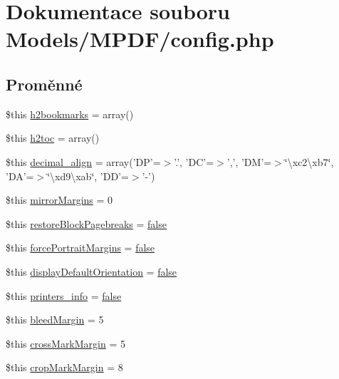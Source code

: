 \hypertarget{config_8php}{\section{Dokumentace souboru Models/\-M\-P\-D\-F/config.php}
\label{config_8php}
}
\subsection*{Proměnné}
\begin{DoxyCompactItemize}
\item 
\$this \hyperlink{config_8php_a0d318a973a665abc308c719941b316a4}{h2bookmarks} = array()
\item 
\$this \hyperlink{config_8php_a7fdd837f73ced736bdaa63537f326fec}{h2toc} = array()
\item 
\$this \hyperlink{config_8php_a93e75bd3c5d3fbd3597725a7a860b96f}{decimal\-\_\-align} = array('D\-P'=$>$'.', 'D\-C'=$>$',', 'D\-M'=$>$\char`\"{}\textbackslash{}xc2\textbackslash{}xb7\char`\"{}, 'D\-A'=$>$\char`\"{}\textbackslash{}xd9\textbackslash{}xab\char`\"{}, 'D\-D'=$>$'-\/')
\item 
\$this \hyperlink{config_8php_aa59c8abfc07e5650f35f9c872bd88a43}{mirror\-Margins} = 0
\item 
\$this \hyperlink{config_8php_a32f3f6af8615f8df0741fff17b4980ff}{restore\-Block\-Pagebreaks} = \hyperlink{ttfontsuni_8php_afbaa04e5cc97693dc668b3c45d3dd740}{false}
\item 
\$this \hyperlink{config_8php_a9546e70e45cfabe2c73bf7d917b56704}{force\-Portrait\-Margins} = \hyperlink{ttfontsuni_8php_afbaa04e5cc97693dc668b3c45d3dd740}{false}
\item 
\$this \hyperlink{config_8php_a0b6854be26e5908e4df28125200e43ea}{display\-Default\-Orientation} = \hyperlink{ttfontsuni_8php_afbaa04e5cc97693dc668b3c45d3dd740}{false}
\item 
\$this \hyperlink{config_8php_a56c54d0593579c1b3e71753ca9dc12c2}{printers\-\_\-info} = \hyperlink{ttfontsuni_8php_afbaa04e5cc97693dc668b3c45d3dd740}{false}
\item 
\$this \hyperlink{config_8php_a270ce26acf6d2614c717fec7a5db0cf4}{bleed\-Margin} = 5
\item 
\$this \hyperlink{config_8php_aabd4ce24f2bf79414ecac594fce1a38c}{cross\-Mark\-Margin} = 5
\item 
\$this \hyperlink{config_8php_a2d3a357d51469a8c5445f2c6618888a8}{crop\-Mark\-Margin} = 8
\item 

\end{DoxyCompactItemize}
